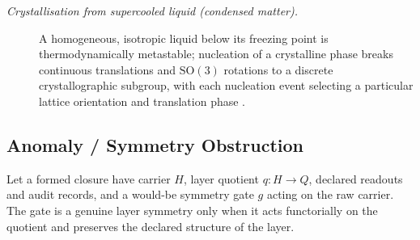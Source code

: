 \documentclass[11pt]{article}
\theoremstyle{definition}
\begin{document}
\begin{description}
\item[\emph{Crystallisation from supercooled liquid (condensed
matter).}]
A homogeneous, isotropic liquid below its freezing point is
thermodynamically metastable; nucleation of a crystalline phase
breaks continuous translations and \(\mathrm{SO}(3)\) rotations to
a discrete crystallographic subgroup, with each nucleation event
selecting a particular lattice orientation and translation phase
\citep{Turnbull1950FormationCrystalNuclei}.
\end{description}

\subsection{Anomaly / Symmetry Obstruction}\label{sec:symmetry:anomaly}

Let a formed closure have carrier \(H\), layer quotient
\(q:H\to Q\), declared readouts and audit records, and a would-be
symmetry gate \(g\) acting on the raw carrier.  The gate is a genuine
layer symmetry only when it acts functorially on the quotient and
preserves the declared structure of the layer.
\end{document}
